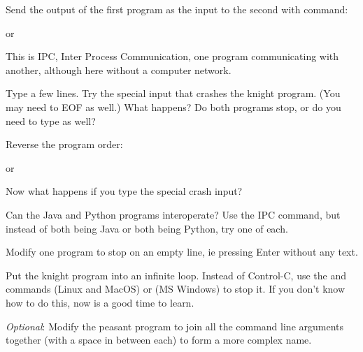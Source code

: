 
Send the output of the first program as the input to the second with command:

or

This is IPC, Inter Process Communication, one program communicating with another,
although here without a computer network.

Type a few lines. Try the special input that crashes the knight program. (You
may need to EOF as well.) What happens? Do both programs stop, or do you need to
type  as well?

Reverse the program order:

or

Now what happens if you type the special crash input?



Can the Java and Python programs interoperate? Use the IPC command, but instead
of both being Java or both being Python, try one of each.

Modify one program to stop on an empty line, ie pressing Enter without any text.

Put the knight program into an infinite loop. Instead of Control-C, use the
 and  commands (Linux and MacOS) or 
(MS Windows) to stop it. If you don't know how to do this, now is a good time
to learn.

\emph{Optional}: Modify the peasant program to join all the command line arguments
together (with a space in between each) to form a more complex name.


\COPYRIGHT


